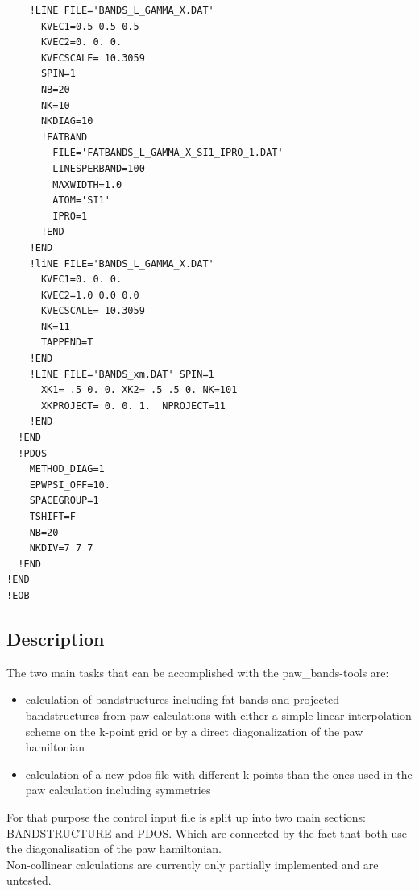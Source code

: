 \documentclass[final,12pt,makeidx,DIV=calc]{article}
\begin{document}
{{{{{{\begin{verbatim}
    !LINE FILE='BANDS_L_GAMMA_X.DAT'
      KVEC1=0.5 0.5 0.5   
      KVEC2=0. 0. 0. 
      KVECSCALE= 10.3059  
      SPIN=1
      NB=20
      NK=10
      NKDIAG=10
      !FATBAND 
        FILE='FATBANDS_L_GAMMA_X_SI1_IPRO_1.DAT'
        LINESPERBAND=100
        MAXWIDTH=1.0
        ATOM='SI1'
        IPRO=1
      !END
    !END
    !liNE FILE='BANDS_L_GAMMA_X.DAT'
      KVEC1=0. 0. 0. 
      KVEC2=1.0 0.0 0.0   
      KVECSCALE= 10.3059      
      NK=11
      TAPPEND=T
    !END
    !LINE FILE='BANDS_xm.DAT' SPIN=1
      XK1= .5 0. 0. XK2= .5 .5 0. NK=101 
      XKPROJECT= 0. 0. 1.  NPROJECT=11 
    !END
  !END
  !PDOS
    METHOD_DIAG=1
    EPWPSI_OFF=10.
    SPACEGROUP=1
    TSHIFT=F
    NB=20
    NKDIV=7 7 7
  !END
!END
!EOB
\end{verbatim}

\subsection{Description}

The two main tasks that can be accomplished with the paw\_bands-tools are:
\begin{itemize} 
  \item calculation of bandstructures including fat bands and
      projected bandstructures from paw-calculations with either a simple linear
      interpolation scheme on the k-point grid or by a direct diagonalization of
      the paw hamiltonian
  \item calculation of a new pdos-file with different k-points than 
    the ones used in the paw calculation including symmetries
\end{itemize}

For that purpose the control input file is split up into two main sections:
BANDSTRUCTURE and PDOS. Which are connected by the fact that both use the
diagonalisation of the paw hamiltonian.\\ Non-collinear calculations are
currently only partially implemented and  are untested.

}}}}}}
\end{document}

